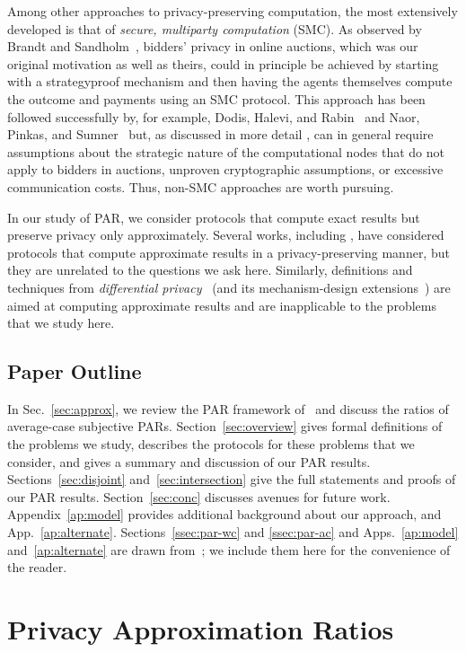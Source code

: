 \documentclass{article}
\theoremstyle{theorem}
\theoremstyle{definition}
\theoremstyle{remark}
\begin{document}
Among other approaches to privacy-preserving computation, the most extensively developed
is that of {\it secure, multiparty computation} (SMC).  As observed by Brandt and Sandholm~\cite{BS},
bidders' privacy in online auctions, which was our original motivation as well as theirs, could in
principle be achieved by starting with a strategyproof mechanism and then having the agents
themselves compute the outcome and payments using an SMC protocol.  This approach has been followed
successfully by, for example, Dodis, Halevi, and Rabin~\cite{DHR00} and Naor, Pinkas, and
Sumner~\cite{NPS99} but, as discussed in more detail \cite{BS,fjs09tr14}, can in general require
assumptions about the strategic nature of the computational nodes that do not apply to bidders in
auctions, unproven cryptographic assumptions, or excessive communication costs.  Thus, non-SMC
approaches are worth pursuing.

In our study of PAR, we consider protocols that compute exact results but
preserve privacy only approximately.  Several works, including \cite{BCNW,FIMNSW,HKKN}, have considered
protocols that compute approximate results in a privacy-preserving manner, but they are unrelated to the
questions we ask here.  Similarly, definitions and techniques from {\it differential
privacy}~\cite{DiffPrivSurvey} (and its mechanism-design extensions~\cite{mt07focs,GRS09}) are aimed at
computing approximate results and are inapplicable to the problems that we study here.

\subsection{Paper Outline}

In Sec.~\ref{sec:approx}, we review the PAR framework of~\cite{fjs09tr14} and discuss the ratios of average-case subjective PARs.  Section~\ref{sec:overview} gives formal definitions of the problems we study, describes the protocols for these problems that we consider, and gives a summary and discussion of our PAR results.  Sections~\ref{sec:disjoint} and~\ref{sec:intersection} give the full statements and proofs of our PAR results.  Section~\ref{sec:conc} discusses avenues for future work.  Appendix~\ref{ap:model} provides additional background about our approach, and App.~\ref{ap:alternate}.  Sections~\ref{ssec:par-wc} and \ref{ssec:par-ac} and Apps.~\ref{ap:model} and~\ref{ap:alternate} are drawn from~\cite{fjs09tr14}; we include them here for the convenience of the reader.

\section{Privacy Approximation Ratios}\label{section-PAR-definitions}\label{sec:approx}
\end{document}
